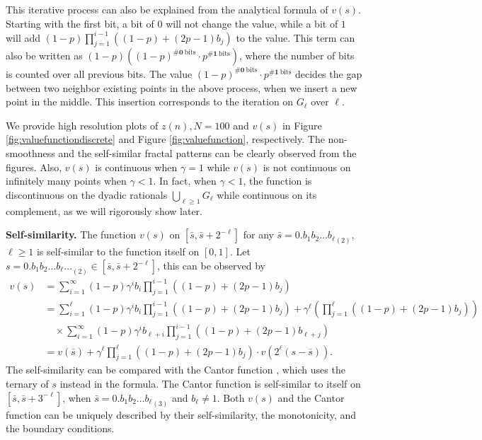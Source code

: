 \documentclass{article}
\theoremstyle{named}
\begin{document}
This iterative process can also be explained from the analytical formula of $v(s)$. Starting with the first bit, a bit of $0$ will not change the value, while a bit of $1$ will add $(1-p)\prod_{j=1}^{i-1}((1-p)+(2p-1)b_j)$ to the value. This term can also be written as $(1-p)((1-p)^{\#\bm{0} \ \text{bits}}\cdot p^{\#\bm{1} \ \text{bits}})$, where the number of bits is counted over all previous bits.
The value $(1-p)^{\#\bm{0} \ \text{bits}}\cdot p^{\#\bm{1} \ \text{bits}}$ decides the gap between two neighbor existing points in the above process, when we insert a new point in the middle. This insertion corresponds to the iteration on $G_\ell$ over $\ell$.

We provide high resolution plots of $z(n), N=100$ and $v(s)$ in Figure \ref{fig:valuefunctiondiscrete} and Figure \ref{fig:valuefunction}, respectively. The non-smoothness and the self-similar fractal patterns can be clearly observed from the figures. 
Also, $v(s)$ is continuous when $\gamma=1$ while $v(s)$ is not continuous on infinitely many points when $\gamma<1$. In fact, when $\gamma<1$, the function is discontinuous on the dyadic rationals $\bigcup_{\ell \ge 1} G_{\ell}$ while continuous on its complement, as we will rigorously show later.

\textbf{Self-similarity.} 
The function $v(s)$ on $[\bar s,\bar s+2^{-\ell}]$ for any $\bar s={0.b_1b_2 \dots b_\ell}_{(2)}$, $\ell\ge 1$ is self-similar to the function itself on $[0,1]$. Let $s = 0.{b_1b_2\dots b_\ell \ldots}_{(2)}\in [\bar s,\bar s+2^{-\ell}]$, this can be observed by 
\begin{align}
\label{eqn:selfsim}
v(s) & = \sum_{i=1}^\infty (1-p)\gamma^i b_i\prod_{j=1}^{i-1}((1-p)+(2p-1)b_j)\nonumber\\
& = \sum_{i=1}^{\ell} (1-p)\gamma^i b_i\prod_{j=1}^{i-1}((1-p)+(2p-1)b_j) + \gamma^{\ell} (\prod_{j=1}^{\ell}((1-p)+(2p-1)b_j))\nonumber\\
& \quad \times \sum_{i=1}^\infty (1-p)\gamma^i b_{\ell+i}\prod_{j=1}^{i-1}((1-p)+(2p-1)b_{\ell+j})\nonumber\\
& = v(\bar s) + \gamma^{\ell}\prod_{j=1}^{\ell}((1-p)+(2p-1)b_j)\cdot v(2^\ell (s-\bar s)).
\end{align}
The self-similarity can be compared with the Cantor function \citep{dovgoshey2006cantor,mandelbrot1985self}, which uses the ternary of $s$ instead in the formula. 
The Cantor function is self-similar to itself on $[\bar s, \bar s + 3^{-\ell}]$, when $\bar s= {0.{b_1}b_2\dots {b_\ell}}_{(3)}$ and ${b_\ell} \neq 1$. 
Both $v(s)$ and the Cantor function can be uniquely described by their self-similarity, the monotonicity, and the boundary conditions.
\end{document}
